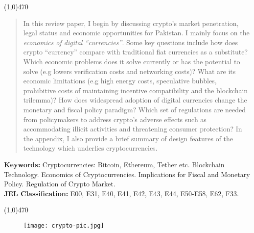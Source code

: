 \documentclass[12pt]{article}
\newcommand{\1}{\mathbbm 1}
\begin{document}
		

		

	
	
	
		
		\begin{center}
			\line(1,0){470}
		\end{center}
		\begin{spacing}{1.1}
			\vspace{-3ex}
			\begin{abstract}
				\noindent 
				In this review paper, I begin by discussing crypto's market penetration, legal status and economic opportunities for Pakistan. I mainly focus on the \textit{economics of digital ``currencies''}. Some key questions include how does crypto ``currency'' compare with traditional fiat currencies as a substitute? Which economic problems does it solve currently or has the potential to solve (e.g lowers verification costs and networking costs)? What are its economic limitations (e.g high energy costs, speculative bubbles, prohibitive costs of maintaining incentive compatibility and the blockchain trilemma)? How does widespread adoption of digital currencies change the monetary and fiscal policy paradigm? Which set of regulations are needed from policymakers to address crypto's adverse effects such as accommodating illicit activities and threatening consumer protection? In the appendix, I also provide a brief summary of design features of the technology which underlies cryptocurrencies.
			\end{abstract}
		\end{spacing}
		\textbf{Keywords:} Cryptocurrencies: Bitcoin, Ethereum, Tether etc. Blockchain Technology. Economics of Cryptocurrencies. Implications for Fiscal and Monetary Policy. Regulation of Crypto Market. {}\\
		\textbf{JEL Classification:} E00, E31, E40, E41, E42, E43, E44, E50-E58, E62, F33.
		\\
		\begin{center}
			\vspace{-8ex}
			\line(1,0){470}
		\end{center}
		\baselineskip=18pt 
		
		\newpage{}
		
			\begin{figure}[H]
			\begin{center}
				\texttt{[image: crypto-pic.jpg]}		
				\caption*{}
			\end{center}
		\end{figure}
	
\end{document}
